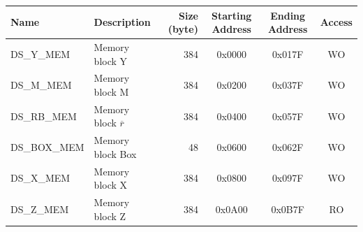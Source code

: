 \begin{longtable}{ | p{3cm} | p{3cm} | r | c | c | c | }
\hline
\rowcolor{lightgray}
Name & Description &  Size (byte) & Starting Address & Ending Address & Access \\ \hline
{DS\_Y\_MEM}\label{DSYMEM}  & Memory block Y  & 384  & 0x0000 & 0x017F & WO \\ \hline
{DS\_M\_MEM}\label{DSMMEM}  & Memory block M  & 384  & 0x0200 & 0x037F & WO \\ \hline
{DS\_RB\_MEM}\label{DSRBMEM}  & Memory block $\overline{r}$  & 384  & 0x0400 & 0x057F & WO \\ \hline
{DS\_BOX\_MEM}\label{DSBOXMEM}  & Memory block Box  & 48  & 0x0600 & 0x062F & WO \\ \hline
{DS\_X\_MEM}\label{DSXMEM}  & Memory block X  & 384  & 0x0800 & 0x097F & WO \\ \hline
{DS\_Z\_MEM}\label{DSZMEM}  & Memory block Z  & 384  & 0x0A00 & 0x0B7F & RO \\ \hline
\end{longtable}
